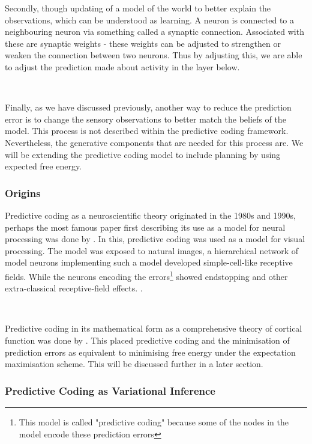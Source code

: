 \documentclass{article}
\begin{document}
Secondly, though updating of a model of the world to better explain the observations, which can be understood as learning. A neuron is connected to a neighbouring neuron via something called a synaptic connection. Associated with these are synaptic weights - these weights can be adjusted to strengthen or weaken the connection between two neurons. Thus by adjusting this, we are able to adjust the prediction made about activity in the layer below.

\

Finally, as we have discussed previously, another way to reduce the prediction error is to change the sensory observations to better match the beliefs of the model. This process is not described within the predictive coding framework. Nevertheless, the generative components that are needed for this process are. We will be extending the predictive coding model to include planning by using expected free energy. 

\subsubsection{Origins}

Predictive coding as a neuroscientific theory originated in the 1980s and 1990s, perhaps the most famous paper first describing its use as a model for neural processing was done by \citet{rao1999predictive}. In this, predictive coding was used as a model for visual processing. The model was exposed to natural images, a hierarchical network of model neurons implementing such a model developed simple-cell-like receptive fields. While the neurons encoding the errors\footnote{This model is called "predictive coding" because some of the nodes in the model encode these prediction errors} showed endstopping and other extra-classical receptive-field effects. \citep{rao1999predictive}.

\

Predictive coding in its mathematical form as a comprehensive theory of cortical function was done by \citet{friston2003learning, friston2005theory}. This placed predictive coding and the minimisation of prediction errors as equivalent to minimising free energy under the expectation maximisation scheme. \citep{dempster1977maximum} This will be discussed further in a later section.

\subsubsection{Predictive Coding as Variational Inference}
\end{document}
